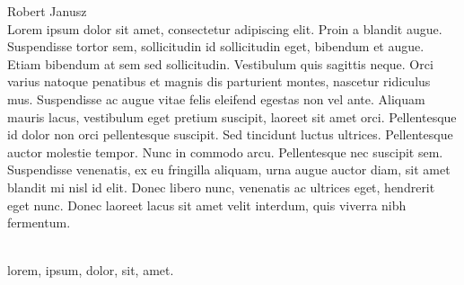 \begin{newrevplenv}{Robert Janusz}
{}\\
{Lorem ipsum dolor sit amet, consectetur adipiscing elit. Proin a blandit augue. Suspendisse tortor sem, sollicitudin id sollicitudin eget, bibendum et augue. Etiam bibendum at sem sed sollicitudin. Vestibulum quis sagittis neque. Orci varius natoque penatibus et magnis dis parturient montes, nascetur ridiculus mus. Suspendisse ac augue vitae felis eleifend egestas non vel ante. Aliquam mauris lacus, vestibulum eget pretium suscipit, laoreet sit amet orci. Pellentesque id dolor non orci pellentesque suscipit. Sed tincidunt luctus ultrices. Pellentesque auctor molestie tempor. Nunc in commodo arcu. Pellentesque nec suscipit sem. Suspendisse venenatis, ex eu fringilla aliquam, urna augue auctor diam, sit amet blandit mi nisl id elit. Donec libero nunc, venenatis ac ultrices eget, hendrerit eget nunc. Donec laoreet lacus sit amet velit interdum, quis viverra nibh fermentum.}\par%
\vspace{2mm}%
{}\\%
{lorem, ipsum, dolor, sit, amet.}%


\end{newrevplenv}